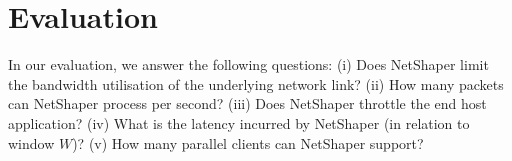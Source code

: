 \section{Evaluation}
\label{sec:netshaper-evaluation}

In our evaluation, we answer the following questions:
(i) Does NetShaper limit the bandwidth utilisation of the underlying network link?
(ii) How many packets can NetShaper process per second?
(iii) Does NetShaper throttle the end host application?
(iv) What is the latency incurred by NetShaper (in relation to window $W$)?
(v) How many parallel clients can NetShaper support?






